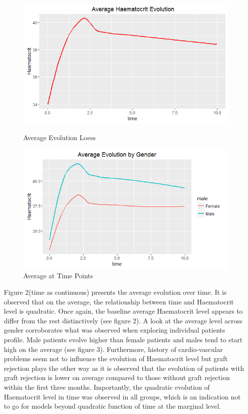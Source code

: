 \documentclass[11pt]{article}
\begin{document}
\begin{figure}[H]
\centering
\begin{minipage}{.5\textwidth}
\includegraphics[scale=0.6]{averageevolution.png}
\caption{Average Evolution Loess}
\end{minipage}
\begin{minipage}{.4\textwidth}
\includegraphics[scale=0.6]{averageevolutiongender.png}
\caption{Average at Time Points}
\end{minipage}
\end{figure}

Figure 2(time as continuous) presents the average evolution over time. It is observed that on the average, the relationship between time and Haematocrit level is quadratic. Once again, the baseline average Haematocrit level appears to differ from the rest distinctively (see figure 2). A look at the average level across gender corroborates what was observed when exploring individual patients profile. Male patients evolve higher than female patients and males tend to start high on the average (see figure 3). Furthermore, history of cardio-vascular problems seem not to influence the evolution of Haematocrit level but graft rejection plays the other way as it is observed that the evolution of patients with graft rejection is lower on average compared to those without graft rejection within the first three months. Importantly, the quadratic evolution of Haematocrit level in time was observed in all groups, which is an indication not to go for models beyond quadratic function of time at the marginal level.
\end{document}
